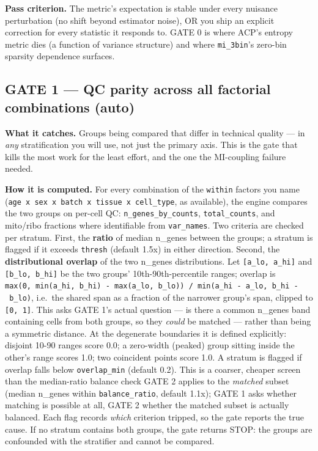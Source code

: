 \documentclass[
  11pt,
]{article}
\begin{document}
\textbf{Pass criterion.} The metric's expectation is stable under every
nuisance perturbation (no shift beyond estimator noise), OR you ship an
explicit correction for every statistic it responds to. GATE 0 is where
ACP's entropy metric dies (a function of variance structure) and where
\texttt{mi\_3bin}'s zero-bin sparsity dependence surfaces.

\subsection{GATE 1 --- QC parity across all factorial combinations
(auto)}\label{gate-1-qc-parity-across-all-factorial-combinations-auto}

\textbf{What it catches.} Groups being compared that differ in technical
quality --- in \emph{any} stratification you will use, not just the
primary axis. This is the gate that kills the most work for the least
effort, and the one the MI-coupling failure needed.

\textbf{How it is computed.} For every combination of the
\texttt{within} factors you name
(\texttt{age\ x\ sex\ x\ batch\ x\ tissue\ x\ cell\_type}, as
available), the engine compares the two groups on per-cell QC:
\texttt{n\_genes\_by\_counts}, \texttt{total\_counts}, and mito/ribo
fractions where identifiable from \texttt{var\_names}. Two criteria are
checked per stratum. First, the \textbf{ratio} of median n\_genes
between the groups; a stratum is flagged if it exceeds \texttt{thresh}
(default 1.5x) in either direction. Second, the \textbf{distributional
overlap} of the two n\_genes distributions. Let
\texttt{{[}a\_lo,\ a\_hi{]}} and \texttt{{[}b\_lo,\ b\_hi{]}} be the two
groups' 10th-90th-percentile ranges; overlap is
\texttt{max(0,\ min(a\_hi,\ b\_hi)\ -\ max(a\_lo,\ b\_lo))\ /\ min(a\_hi\ -\ a\_lo,\ b\_hi\ -\ b\_lo)},
i.e.~the shared span as a fraction of the narrower group's span, clipped
to \texttt{{[}0,\ 1{]}}. This asks GATE 1's actual question --- is there
a common n\_genes band containing cells from both groups, so they
\emph{could} be matched --- rather than being a symmetric distance. At
the degenerate boundaries it is defined explicitly: disjoint 10-90
ranges score 0.0; a zero-width (peaked) group sitting inside the other's
range scores 1.0; two coincident points score 1.0. A stratum is flagged
if overlap falls below \texttt{overlap\_min} (default 0.2). This is a
coarser, cheaper screen than the median-ratio balance check GATE 2
applies to the \emph{matched} subset (median n\_genes within
\texttt{balance\_ratio}, default 1.1x); GATE 1 asks whether matching is
possible at all, GATE 2 whether the matched subset is actually balanced.
Each flag records \emph{which} criterion tripped, so the gate reports
the true cause. If no stratum contains both groups, the gate returns
STOP: the groups are confounded with the stratifier and cannot be
compared.
\end{document}
